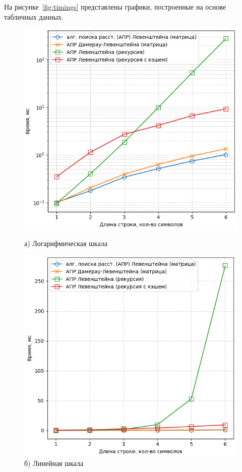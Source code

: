 На рисунке~\ref{fig:timings} представлены графики, построенные на основе табличных данных.

\begin{figure}[!htb]
    \centering
    \begin{minipage}[t]{0.55\textwidth}
        \centering
        \includegraphics[width=\linewidth]{inc/img/logarithmic.png}
        \caption*{а) Логарифмическая шкала}
    \end{minipage}

    \vspace{1em}

    \begin{minipage}[t]{0.55\textwidth}
        \centering
        \includegraphics[width=\linewidth]{inc/img/default.png}
        \caption*{б) Линейная шкала}
    \end{minipage}


\end{figure}
